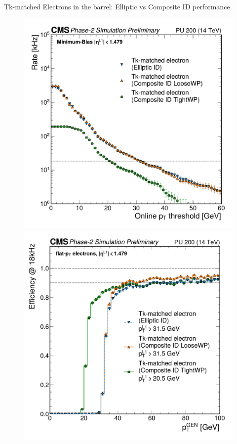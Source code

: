 \documentclass[aspectratio=169]{beamer}\usepackage[utf8]{inputenc}
\begin{document}
\begin{frame}{Tk-matched Electrons in the barrel: Elliptic vs Composite ID performance}
\begin{figure}
\centering
    \includegraphics[height=0.55\textheight,trim={0 2cm 0 2.2cm}]{barrel_figs/slides22/rate.pdf}
    \includegraphics[height=0.55\textheight,trim={0 2cm 0 2.2cm}]{barrel_figs/slides22/pteff-1.pdf}


\end{figure}
\end{frame}
\end{document}

